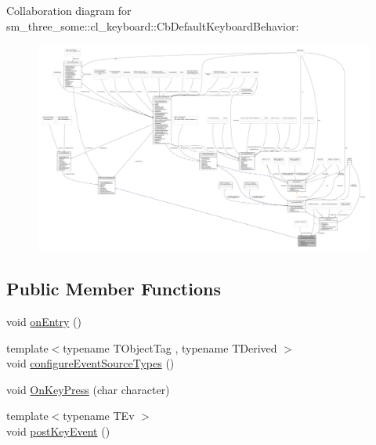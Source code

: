 Collaboration diagram for sm\+\_\+three\+\_\+some\+:\+:cl\+\_\+keyboard\+:\+:Cb\+Default\+Keyboard\+Behavior\+:
\nopagebreak
\begin{figure}[H]
\begin{center}
\leavevmode
\includegraphics[width=350pt]{classsm__three__some_1_1cl__keyboard_1_1CbDefaultKeyboardBehavior__coll__graph}
\end{center}
\end{figure}
\subsection*{Public Member Functions}
\begin{DoxyCompactItemize}
\item 
void \hyperlink{classsm__three__some_1_1cl__keyboard_1_1CbDefaultKeyboardBehavior_a140345da0fb764a06f7450051b5112b6}{on\+Entry} ()
\item 
{\footnotesize template$<$typename T\+Object\+Tag , typename T\+Derived $>$ }\\void \hyperlink{classsm__three__some_1_1cl__keyboard_1_1CbDefaultKeyboardBehavior_a82b9653895f5be5b8c386378c1b08d81}{configure\+Event\+Source\+Types} ()
\item 
void \hyperlink{classsm__three__some_1_1cl__keyboard_1_1CbDefaultKeyboardBehavior_a0e3fcaff331a579283456a47213a99a8}{On\+Key\+Press} (char character)
\item 
{\footnotesize template$<$typename T\+Ev $>$ }\\void \hyperlink{classsm__three__some_1_1cl__keyboard_1_1CbDefaultKeyboardBehavior_ae72eccad6263e249a33759a43973acdb}{post\+Key\+Event} ()
\end{DoxyCompactItemize}
